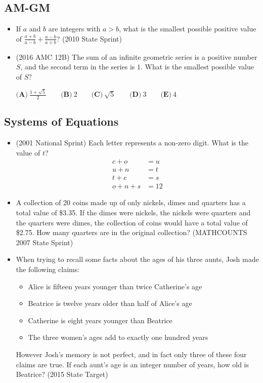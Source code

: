 \documentclass{article}
\begin{document}
\subsection{AM-GM}
\begin{itemize}
\item If $a$ and $b$ are integers with $a>b$, what is the smallest possible positive value of $\frac{a+b}{a-b}+\frac{a-b}{a+b}$? (2010 State Sprint)

\item (2016 AMC 12B) The sum of an infinite geometric series is a positive number $S$, and the second term in the series is $1$. What is the smallest possible value of $S?$

\begin{center}
$\textbf{(A)}\ \frac{1+\sqrt{5}}{2} \qquad
\textbf{(B)}\ 2 \qquad
\textbf{(C)}\ \sqrt{5} \qquad
\textbf{(D)}\ 3 \qquad
\textbf{(E)}\ 4$
\end{center}

\end{itemize}


\subsection{Systems of Equations}
\begin{itemize}
\item (2001 National Sprint) Each letter represents a non-zero digit. What is the value of $t$?
\begin{align*}
c+o&=u \\
u+n &= t\\
t+c &=s\\
o+n+s &=12
\end{align*}


\item A collection of 20 coins made up of only nickels, dimes and quarters has a total value of \$3.35. If the dimes were nickels, the nickels were quarters and the quarters were dimes, the collection of coins would have a total value of \$2.75. How many quarters are in the original collection? (MATHCOUNTS 2007 State Sprint)

\item When trying to recall some facts about the ages of his three aunts, Josh made the following claims:
\begin{itemize}
\item Alice is fifteen years younger than twice Catherine's age
\item Beatrice is twelve years older than half of Alice's age
\item Catherine is eight years younger than Beatrice
\item The three women's ages add to exactly one hundred years

\end{itemize}
However Josh's memory is not perfect, and in fact only three of these four claims are true. If each aunt's age is an integer number of years, how old is Beatrice? (2015 State Target)


\end{itemize}
\end{document}
